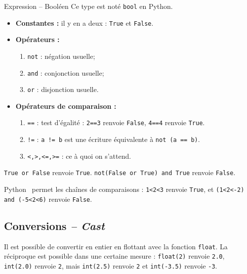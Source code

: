 \begin{defi}{Expression -- Booléen}
Ce type est noté \texttt{bool} en Python.
\begin{itemize}
\item \textbf{Constantes :} il y en a deux : \texttt{True} et \texttt{False}.
\item \textbf{Opérateurs :}
\begin{enumerate}
 \item \texttt{not} : négation usuelle;
 \item \texttt{and} : conjonction usuelle;
 \item \texttt{or} : disjonction usuelle.
\end{enumerate}
\item \textbf{Opérateurs de comparaison :}
\begin{enumerate}
 \item \texttt{==} : test d'égalité : \texttt{2==3} renvoie \texttt{False}, \texttt{4==4} renvoie 
\texttt{True}. %
 \item \texttt{!=} : \texttt{a != b} est une écriture équivalente à \texttt{not (a == b)}.
 \item \texttt{<,>,<=,>=} : ce à quoi on s'attend.
\end{enumerate}
\end{itemize}
\end{defi}


\begin{exemple}
\texttt{True or False} renvoie \texttt{True}. \texttt{not(False or True) and True} renvoie \texttt{False}.
\end{exemple}

\begin{rem}
Python \ permet les chaînes de comparaisons : \texttt{1<2<3} renvoie
\texttt{True}, et \texttt{(1<2<-2) and (-5<2<6)} renvoie \texttt{False}.
\end{rem}

\subsection{Conversions \textit{-- Cast}}

Il est possible de convertir en entier en flottant avec la fonction \texttt{float}. La réciproque est possible dans une certaine 
mesure : \texttt{float(2)} renvoie \texttt{2.0}, \texttt{int(2.0)} renvoie \texttt{2}, mais \texttt{int(2.5)} renvoie \texttt{2} et 
\texttt{int(-3.5)} renvoie \texttt{-3}.


